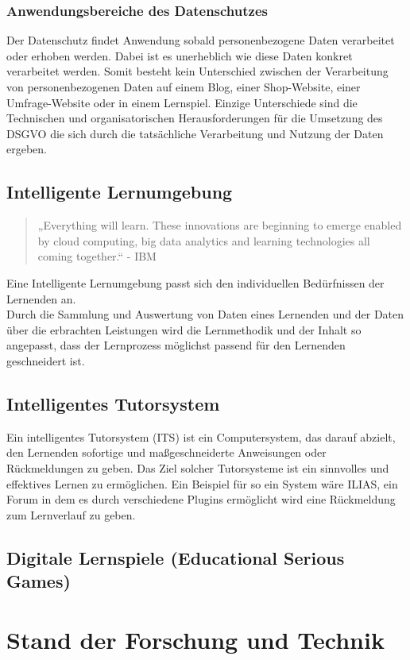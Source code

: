 \documentclass[a4paper, 12pt]{article}
\begin{document}
\subsubsection{Anwendungsbereiche des Datenschutzes}
Der Datenschutz findet Anwendung sobald personenbezogene Daten verarbeitet oder erhoben werden. Dabei ist es unerheblich wie diese Daten konkret verarbeitet werden. Somit besteht kein Unterschied zwischen der Verarbeitung von personenbezogenen Daten auf einem Blog, einer Shop-Website, einer Umfrage-Website oder in einem Lernspiel. Einzige Unterschiede sind die Technischen und organisatorischen Herausforderungen für die Umsetzung des DSGVO die sich durch die tatsächliche Verarbeitung und Nutzung der Daten ergeben.

\subsection{Intelligente Lernumgebung}
\begin{quote}
	„Everything will learn. These innovations are beginning to emerge enabled by cloud computing, big data analytics and learning technologies all coming together.“ - IBM
\end{quote}
\noindent Eine Intelligente Lernumgebung passt sich den individuellen Bedürfnissen der Lernenden an. \\
Durch die Sammlung und Auswertung von Daten eines Lernenden und der Daten über die erbrachten Leistungen wird die Lernmethodik und der Inhalt so angepasst, dass der Lernprozess möglichst passend für den Lernenden geschneidert ist. 

\subsection{Intelligentes Tutorsystem}
Ein intelligentes Tutorsystem (ITS) ist ein Computersystem, das darauf abzielt, den Lernenden sofortige und maßgeschneiderte Anweisungen oder Rückmeldungen zu geben. Das Ziel solcher Tutorsysteme ist ein sinnvolles und effektives Lernen zu ermöglichen. Ein Beispiel für so ein System wäre ILIAS, ein Forum in dem es durch verschiedene Plugins ermöglicht wird eine Rückmeldung zum Lernverlauf zu geben.


\subsection{Digitale Lernspiele (Educational Serious Games)}

\section{Stand der Forschung und Technik}
\end{document}
